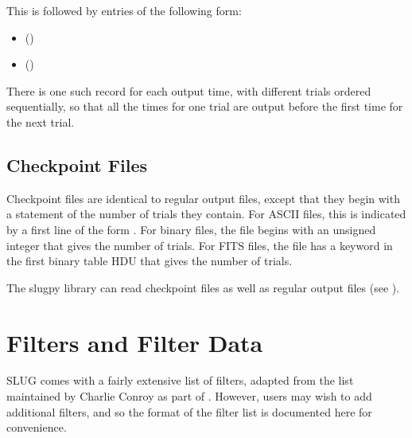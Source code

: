 \documentclass[letterpaper,10pt,english]{sphinxmanual}
\begin{document}
This is followed by  entries of the following form:
\begin{itemize}
\item {} 
 ()

\item {} 
 ()

\end{itemize}

There is one such record for each output time, with different trials
ordered sequentially, so that all the times for one trial are output
before the first time for the next trial.


\section{Checkpoint Files}
\label{\detokenize{output:ssec-checkpoint-files}}\label{\detokenize{output:checkpoint-files}}
Checkpoint files are identical to regular output files, except that
they begin with a statement of the number of trials they contain. For
ASCII files, this is indicated by a first line of the form . For binary files, the file begins with an unsigned integer that
gives the number of trials. For FITS files, the file has a keyword
 in the first binary table HDU that gives the number of
trials.

The slugpy library can read checkpoint files as well as regular output
files (see {\hyperref[\detokenize{slugpy:sec-slugpy}]{}}).


\chapter{Filters and Filter Data}
\label{\detokenize{filters:sec-filters}}\label{\detokenize{filters::doc}}\label{\detokenize{filters:filters-and-filter-data}}
SLUG comes with a fairly extensive list of filters, adapted from the list maintained by Charlie Conroy as part of . However, users may wish to add additional filters, and so the format of the filter list is documented here for convenience.
\end{document}
